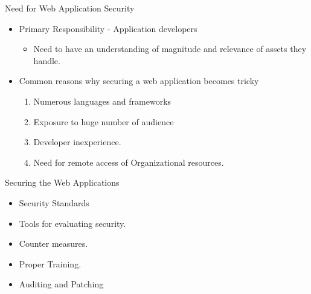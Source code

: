 \documentclass[xcolor=x11names,compress]{beamer}
\renewcommand{\(}{\begin{columns}}
\renewcommand{\)}{\end{columns}}
\newcommand{\<}[1]{\begin{column}{#1}}
\renewcommand{\>}{\end{column}}
\begin{document}
\begin{frame}{Need for Web Application Security}
	\begin{itemize}
		\item Primary Responsibility - Application developers 
		\begin{itemize}
			\item Need to have an understanding of magnitude and relevance of assets they handle.
			\newline
		\end{itemize}
		\item Common reasons why securing a
		web application becomes tricky
		\begin{enumerate}
			\item Numerous languages and frameworks
			\item Exposure to huge number of audience
			\item Developer inexperience.
			\item Need for remote access of Organizational resources. 
		\end{enumerate}
	\end{itemize}
\end{frame}

\begin{frame}{Securing the Web Applications}
	\begin{itemize}
		\item Security Standards
		\newline
		\item Tools for evaluating security.
		\newline
		\item Counter measures.
		\newline
		\item Proper Training.
		\newline
		\item Auditing and Patching 
	\end{itemize}
\end{frame}

\end{document}

